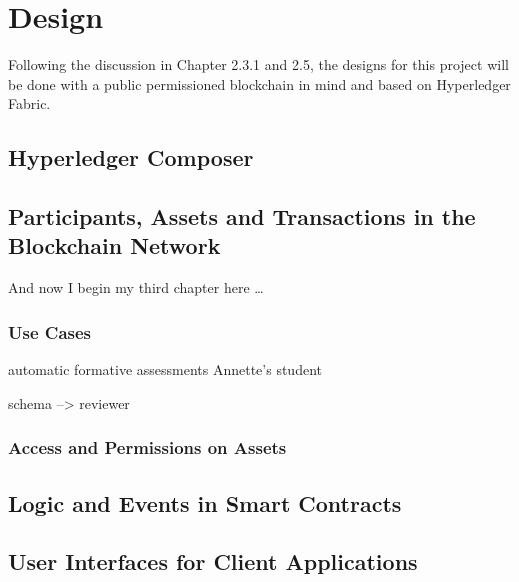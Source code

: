 \chapter{Design}

Following the discussion in Chapter 2.3.1 and 2.5, the designs for this project 
will be done with a public permissioned blockchain in mind and based on 
Hyperledger Fabric.

\section*{Hyperledger Composer}

\section{Participants, Assets and Transactions in the Blockchain Network}
And now I begin my third chapter here \dots

\subsection{Use Cases}

automatic formative assessments Annette's student

schema --> reviewer

\subsection{Access and Permissions on Assets}

\section{Logic and Events in Smart Contracts}

\section{User Interfaces for Client Applications}